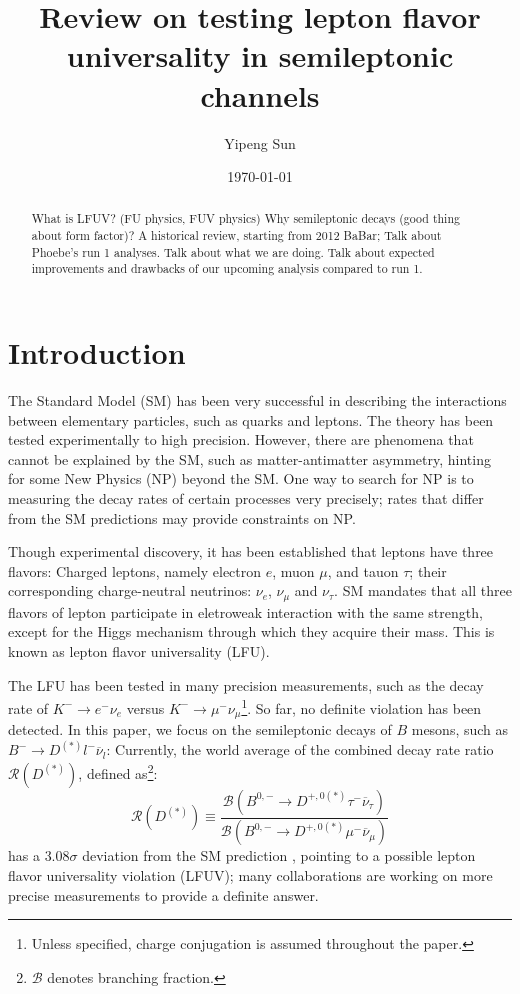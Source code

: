 \documentclass[12pt,letterpaper]{article}
\title{Review on testing lepton flavor universality in semileptonic channels}
\author{Yipeng Sun}
\affil{Department of Physics, University of Maryland}
\date{\today}
\def\RDDst/{\ensuremath{\mathcal{R}(D^{(*)})}}
\begin{document}
\maketitle

\begin{abstract}
    What is LFUV? (FU physics, FUV physics)
    Why semileptonic decays (good thing about form factor)?
    A historical review, starting from 2012 BaBar;
    Talk about Phoebe's run 1 analyses.
    Talk about what we are doing.
    Talk about expected improvements and drawbacks of our upcoming analysis compared
    to run 1.
\end{abstract}

\section{Introduction}
The Standard Model (SM) has been very successful in describing the interactions
between elementary particles, such as quarks and leptons.
The theory has been tested experimentally to high precision.
However, there are phenomena that cannot be explained by the SM, such as
matter-antimatter asymmetry, hinting for some New Physics (NP) beyond the SM.
One way to search for NP is to measuring the decay rates of certain processes
very precisely;
rates that differ from the SM predictions may provide constraints on NP.

Though experimental discovery, it has been established that leptons have three
flavors:
Charged leptons, namely electron $e$, muon $\mu$, and tauon $\tau$;
their corresponding charge-neutral neutrinos: $\nu_e$, $\nu_\mu$ and $\nu_\tau$.
SM mandates that all three flavors of lepton participate in eletroweak
interaction with the same strength, except for the Higgs mechanism through which
they acquire their mass.
This is known as lepton flavor universality (LFU).

The LFU has been tested in many precision measurements, such as the decay rate
of $K^- \rightarrow e^- \nu_e$ versus $K^- \rightarrow \mu^- \nu_\mu$\footnote{
    Unless specified, charge conjugation is assumed throughout the paper.
}.
So far, no definite violation has been detected.
In this paper, we focus on the semileptonic decays of $B$ mesons, such as
$B^- \rightarrow D^{(*)} l^- \overline{\nu}_l$:
Currently, the world average of the combined decay rate ratio $\RDDst/$,
defined as\footnote{
    $\mathcal{B}$ denotes branching fraction.
}:
\begin{equation*}
    \RDDst/ \equiv \frac{
        \mathcal{B}\left(
            B^{0,-} \rightarrow D^{+,0(*)} \tau^- \overline{\nu}_\tau
        \right)
    }{
        \mathcal{B}\left(
            B^{0,-} \rightarrow D^{+,0(*)} \mu^- \overline{\nu}_\mu
        \right)
    }
\end{equation*}
has a $3.08\sigma$ deviation from the SM prediction \cite{HFLAV:2019}, pointing
to a possible lepton flavor universality violation (LFUV);
many collaborations are working on more precise measurements to provide a
definite answer.
\end{document}
